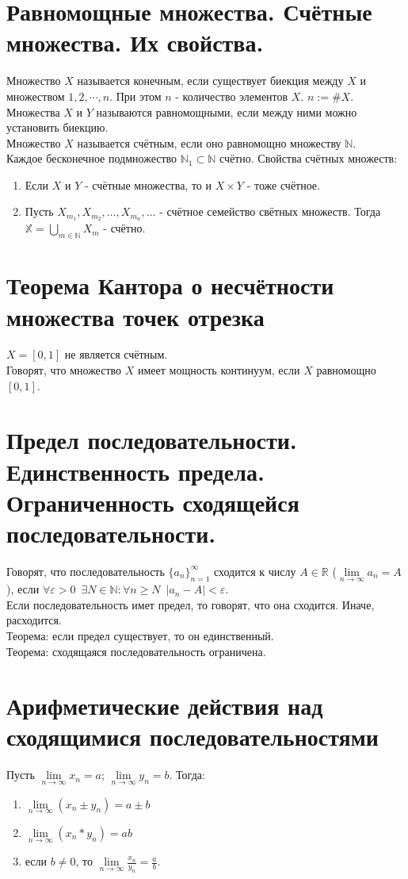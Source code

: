 \documentclass[11pt, a4paper]{article}
\def\X{\mathbb{X}}
\def\R{\mathbb{R}}
\def\N{\mathbb{N}}
\def\sp{\, \, \,}
\def\linf{\lim \limits_{n \to \infty}}
\def\ds{\displaystyle}
\begin{document}
    \section{Равномощные множества. Счётные множества. Их свойства.}
    Множество $X$ называется конечным, если существует биекция между $X$ и множеством $1, 2, \cdots , n$. При этом $n$ - количество элементов $X$. $n:= \# X$.\\
    Множества $X$ и $Y$ называются равномощными, если между ними можно установить биекцию.\\
    Множество $X$ называется счётным, если оно равномощно множеству $\N$.\\
    Каждое бесконечное подмножество $\N_1 \subset \N$ счётно.
    Свойства счётных множеств:
    \begin{enumerate}
        \item Если $X$ и $Y$ - счётные множества, то и $X \times Y$ - тоже счётное.
        \item Пусть $X_{m_1}, X_{m_2}, \ldots, X_{m_n}, \ldots$ - счётное семейство свётных множеств. Тогда $\ds \X = \bigcup_{m \in \N} X_m$ - счётно.
    \end{enumerate}

    \section{Теорема Кантора о несчётности множества точек отрезка}
    $X=[0,1]$ не является счётным.\\
    Говорят, что множество $X$ имеет мощность континуум, если $X$ равномощно $[0,1]$.

    \section{Предел последовательности. Единственность предела. Ограниченность сходящейся последовательности.}
    Говорят, что последовательность $\{a_n\}_{n=1}^{\infty}$ сходится к числу $A \in \R$ ($\linf a_n = A$), если $\forall \varepsilon > 0 \sp \exists N \in \N: \forall n \geq N \sp |a_n - A| < \varepsilon$.\\
    Если последовательность имет предел, то говорят, что она сходится. Иначе, расходится.\\
    Теорема: если предел существует, то он единственный.\\
    Теорема: сходящаяся последовательность ограничена.\\

    \section{Арифметические действия над сходящимися последовательностями}
    Пусть $\linf x_n = a$; $\linf y_n = b$. Тогда:
    \begin{enumerate}
        \item $\linf (x_n \pm y_n) = a \pm b$
        \item $\linf (x_n * y_n) = ab$
        \item если $b \neq 0$, то $\linf \frac{x_n}{y_n} = \frac{a}{b}$.
    \end{enumerate}
\end{document}
